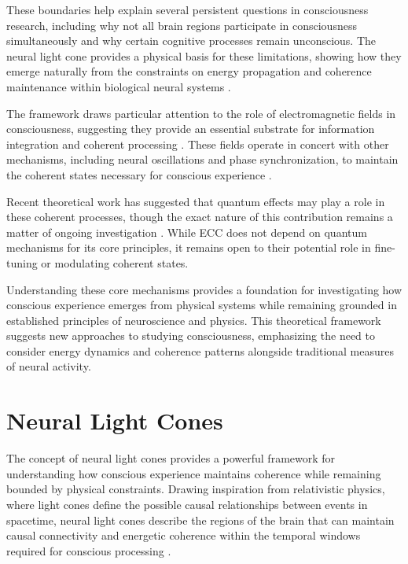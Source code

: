\begin{refsection}
These boundaries help explain several persistent questions in consciousness research, including why not all brain regions participate in consciousness simultaneously and why certain cognitive processes remain unconscious. The neural light cone provides a physical basis for these limitations, showing how they emerge naturally from the constraints on energy propagation and coherence maintenance within biological neural systems \cite{atasoy2016human}.

The framework draws particular attention to the role of electromagnetic fields in consciousness, suggesting they provide an essential substrate for information integration and coherent processing \cite{mcfadden2020integrating, pockett2012electromagnetic}. These fields operate in concert with other mechanisms, including neural oscillations and phase synchronization, to maintain the coherent states necessary for conscious experience \cite{brunel2003what}.

Recent theoretical work has suggested that quantum effects may play a role in these coherent processes, though the exact nature of this contribution remains a matter of ongoing investigation \cite{hameroff2014consciousness2dup}. While ECC does not depend on quantum mechanisms for its core principles, it remains open to their potential role in fine-tuning or modulating coherent states.

Understanding these core mechanisms provides a foundation for investigating how conscious experience emerges from physical systems while remaining grounded in established principles of neuroscience and physics. This theoretical framework suggests new approaches to studying consciousness, emphasizing the need to consider energy dynamics and coherence patterns alongside traditional measures of neural activity.

\section{Neural Light Cones}

The concept of neural light cones provides a powerful framework for understanding how conscious experience maintains coherence while remaining bounded by physical constraints. Drawing inspiration from relativistic physics, where light cones define the possible causal relationships between events in spacetime, neural light cones describe the regions of the brain that can maintain causal connectivity and energetic coherence within the temporal windows required for conscious processing \cite{herzog2016time}.


\end{refsection}
